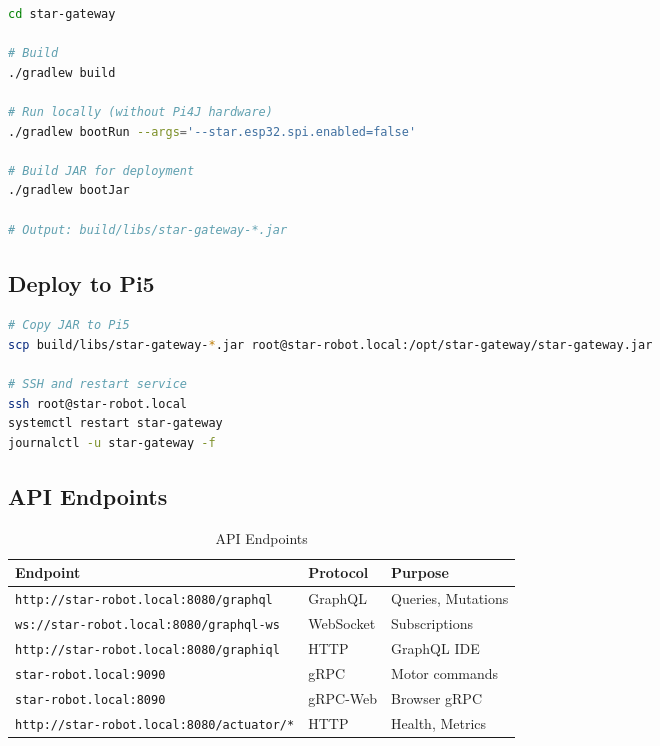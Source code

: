 \begin{lstlisting}[language=bash]
cd star-gateway

# Build
./gradlew build

# Run locally (without Pi4J hardware)
./gradlew bootRun --args='--star.esp32.spi.enabled=false'

# Build JAR for deployment
./gradlew bootJar

# Output: build/libs/star-gateway-*.jar
\end{lstlisting}

\subsection{Deploy to Pi5}

\begin{lstlisting}[language=bash]
# Copy JAR to Pi5
scp build/libs/star-gateway-*.jar root@star-robot.local:/opt/star-gateway/star-gateway.jar

# SSH and restart service
ssh root@star-robot.local
systemctl restart star-gateway
journalctl -u star-gateway -f
\end{lstlisting}

\subsection{API Endpoints}

\begin{table}[H]
\centering
\begin{tabular}{|l|l|l|}
\hline
\textbf{Endpoint} & \textbf{Protocol} & \textbf{Purpose} \\
\hline
\texttt{http://star-robot.local:8080/graphql} & GraphQL & Queries, Mutations \\
\texttt{ws://star-robot.local:8080/graphql-ws} & WebSocket & Subscriptions \\
\texttt{http://star-robot.local:8080/graphiql} & HTTP & GraphQL IDE \\
\texttt{star-robot.local:9090} & gRPC & Motor commands \\
\texttt{star-robot.local:8090} & gRPC-Web & Browser gRPC \\
\texttt{http://star-robot.local:8080/actuator/*} & HTTP & Health, Metrics \\
\hline
\end{tabular}
\caption{API Endpoints}
\end{table}

